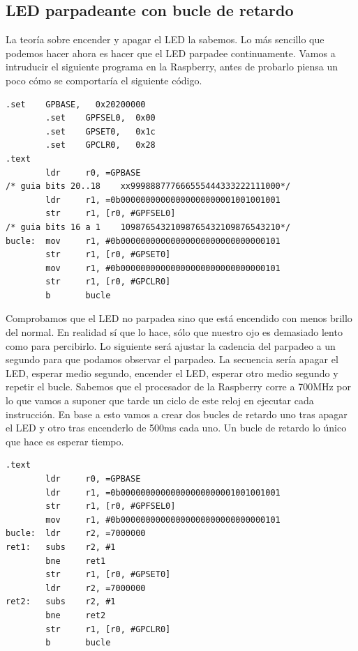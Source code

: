 \subsection{LED parpadeante con bucle de retardo}

La teoría sobre encender y apagar el LED la sabemos. Lo más sencillo que podemos hacer ahora
es hacer que el LED parpadee continuamente. Vamos a intruducir el siguiente programa en la
Raspberry, antes de probarlo piensa un poco cómo se comportaría el siguiente código.

\begin{lstlisting}[caption={esbn3.s},label={lst:codigoPract4_3}]
        .set    GPBASE,   0x20200000
        .set    GPFSEL0,  0x00
        .set    GPSET0,   0x1c
        .set    GPCLR0,   0x28
.text
        ldr     r0, =GPBASE
/* guia bits 20..18    xx999888777666555444333222111000*/
        ldr     r1, =0b00000000000000000000001001001001
        str     r1, [r0, #GPFSEL0]
/* guia bits 16 a 1    10987654321098765432109876543210*/
bucle:  mov     r1, #0b00000000000000000000000000000101
        str     r1, [r0, #GPSET0]
        mov     r1, #0b00000000000000000000000000000101
        str     r1, [r0, #GPCLR0]
        b       bucle
\end{lstlisting}

Comprobamos que el LED no parpadea sino que está encendido con menos brillo del normal.
En realidad sí que lo hace, sólo que nuestro ojo es demasiado lento como para percibirlo.
Lo siguiente será ajustar la cadencia del parpadeo a un segundo para que podamos observar
el parpadeo. La secuencia sería apagar el LED, esperar medio segundo, encender el LED,
esperar otro medio segundo y repetir el bucle. Sabemos que el procesador de la Raspberry
corre a 700MHz por lo que vamos a suponer que tarde un ciclo de este reloj en ejecutar
cada instrucción. En base a esto vamos a crear dos bucles de retardo uno tras apagar el LED
y otro tras encenderlo de 500ms cada uno. Un bucle de retardo lo único que hace es esperar
tiempo. 

\begin{lstlisting}[caption={Parte de esbn4.s},label={lst:codigoPract4_4}]
.text
        ldr     r0, =GPBASE
        ldr     r1, =0b00000000000000000000001001001001
        str     r1, [r0, #GPFSEL0]
        mov     r1, #0b00000000000000000000000000000101
bucle:  ldr     r2, =7000000
ret1:   subs    r2, #1
        bne     ret1
        str     r1, [r0, #GPSET0]
        ldr     r2, =7000000
ret2:   subs    r2, #1
        bne     ret2
        str     r1, [r0, #GPCLR0]
        b       bucle
\end{lstlisting}

